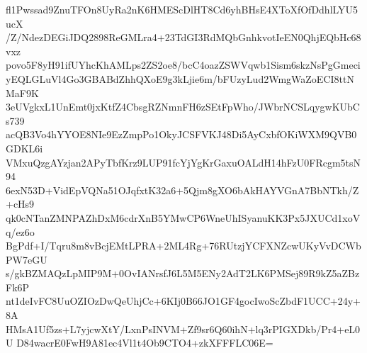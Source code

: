 fl1Pwssad9ZnuTFOn8UyRa2nK6HMEScDlHT8Cd6yhBHsE4XToXfOfDdhlLYU5ucX
/Z/NdezDEGiJDQ2898ReGMLra4+23TdGI3RdMQbGnhkvotIeEN0QhjEQbHc68vxz
povo5F8yH91ifUYhcKhAMLps2ZS2oe8/bcC4oazZSWVqwb1Sism6skzNsPgGmeci
yEQLGLuVl4Go3GBABdZhhQXoE9g3kLjie6m/bFUzyLud2WmgWaZoECI8ttNMaF9K
3eUVgkxL1UnEmt0jxKtfZ4CbsgRZNmnFH6zSEtFpWho/JWbrNCSLqygwKUbCs739
acQB3Vo4hYYOE8NIe9EzZmpPo1OkyJCSFVKJ48Di5AyCxbfOKiWXM9QVB0GDKL6i
VMxuQzgAYzjan2APyTbfKrz9LUP91fcYjYgKrGaxuOALdH14hFzU0FRcgm5tsN94
6exN53D+VidEpVQNa51OJqfxtK32a6+5Qjm8gXO6bAkHAYVGnA7BbNTkh/Z+cHs9
qk0cNTanZMNPAZhDxM6cdrXnB5YMwCP6WneUhISyanuKK3Px5JXUCd1xoVq/ez6o
BgPdf+I/Tqru8m8vBcjEMtLPRA+2ML4Rg+76RUtzjYCFXNZcwUKyVvDCWbPW7eGU
s/gkBZMAQzLpMIP9M+0OvIANrsfJ6L5M5ENy2AdT2LK6PMSej89R9kZ5aZBzFk6P
nt1deIvFC8UuOZIOzDwQeUhjCc+6KIj0B66JO1GF4gocIwoScZbdF1UCC+24y+8A
HMsA1Uf5zs+L7yjcwXtY/LxnPsINVM+Zf9sr6Q60ihN+lq3rPIGXDkb/Pr4+eL0U
D84wacrE0FwH9A81ec4Vl1t4Ob9CTO4+zkXFFFLC06E=
